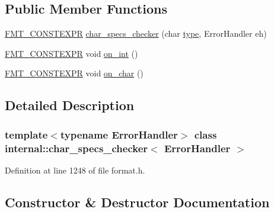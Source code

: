 \subsection*{Public Member Functions}
\begin{DoxyCompactItemize}
\item 
\hyperlink{core_8h_a69201cb276383873487bf68b4ef8b4cd}{F\+M\+T\+\_\+\+C\+O\+N\+S\+T\+E\+X\+PR} \hyperlink{classinternal_1_1char__specs__checker_a67c209630264fd9d4e82c806ce78f5e9}{char\+\_\+specs\+\_\+checker} (char \hyperlink{namespaceinternal_a8661864098ac0acff9a6dd7e66f59038}{type}, Error\+Handler eh)
\item 
\hyperlink{core_8h_a69201cb276383873487bf68b4ef8b4cd}{F\+M\+T\+\_\+\+C\+O\+N\+S\+T\+E\+X\+PR} void \hyperlink{classinternal_1_1char__specs__checker_ad73dc97475d308a789f4bb1581211bec}{on\+\_\+int} ()
\item 
\hyperlink{core_8h_a69201cb276383873487bf68b4ef8b4cd}{F\+M\+T\+\_\+\+C\+O\+N\+S\+T\+E\+X\+PR} void \hyperlink{classinternal_1_1char__specs__checker_a332bcf72661fd9a020834a5b17d352e8}{on\+\_\+char} ()
\end{DoxyCompactItemize}


\subsection{Detailed Description}
\subsubsection*{template$<$typename Error\+Handler$>$\newline
class internal\+::char\+\_\+specs\+\_\+checker$<$ Error\+Handler $>$}



Definition at line 1248 of file format.\+h.



\subsection{Constructor \& Destructor Documentation}
\mbox{\label{classinternal_1_1char__specs__checker_a67c209630264fd9d4e82c806ce78f5e9}} 
